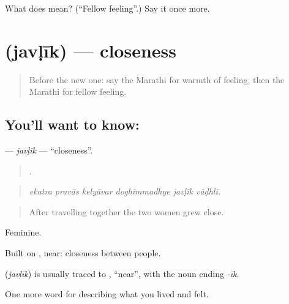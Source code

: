 \begin{tcolorbox}[breakable,colback=teal!4,colframe=teal!35!black,title={Before you move on}]
What does  mean? (\textquotedblleft{}Fellow feeling\textquotedblright{}.) Say it once more.
\end{tcolorbox}
\section[\texorpdfstring{\mr{जवळीक} (javḷīk)}{जवळीक (javḷīk)}]{ (javḷīk) — closeness}

\label{lesson:MR-C460-javlik}



\begin{quote}
Before the new one: say the Marathi for warmth of feeling, then the Marathi for fellow feeling.
\end{quote}

\subsection*{You'll want to know: }
\textbf{} — \emph{javḷīk} — \textquotedblleft{}closeness\textquotedblright{}.

\begin{quote}
     .
\end{quote}

\begin{quote}
\emph{ekatra pravās kelyāvar doghīmmadhye javḷīk vāḍhlī.}
\end{quote}

\begin{quote}
After travelling together the two women grew close.
\end{quote}

Feminine.

Built on , near: closeness between people.

\begin{cousinweb}
\textbf{} (\emph{javḷīk}) is usually traced to , \textquotedblleft{}near\textquotedblright{}, with the noun ending \emph{-īk}.
\end{cousinweb}

\begin{grammarlens}[title={What you've built}]
One more word for describing what you lived and felt.
\end{grammarlens}

